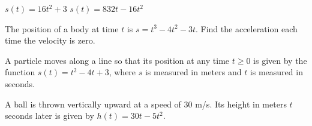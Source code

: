 \begin{questions}
    \question $s(t)=16t^2+3$
    \question $s(t)=832t-16t^2$
    
    \newpage
    
    
    \question The position of a body at time $t$ is $s=t^3-4t^2-3t$. Find the acceleration each time the velocity is zero.
    
    \question A particle moves along a line so that its position at any time $t\ge0$ is given by the function $s(t)=t^2-4t+3$, where $s$ is measured in meters and $t$ is measured in seconds.
    
    \question A ball is thrown vertically upward at a speed of 30 m/s. Its height in meters $t$ seconds later is given by $h(t)=30t-5t^2$.
\end{questions}


\newpage
